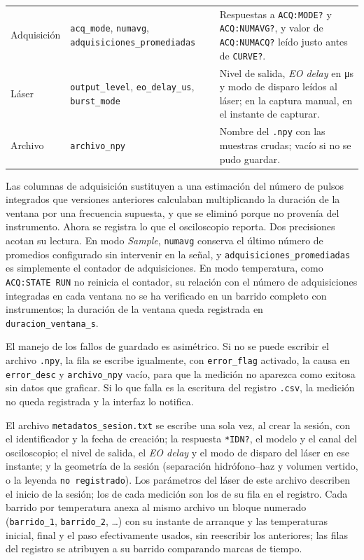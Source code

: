 \begin{table}[H]
\begin{tabularx}{\textwidth}{@{}>{\raggedright\arraybackslash}p{2.1cm}%
      >{\raggedright\arraybackslash}p{4.6cm}%
      >{\raggedright\arraybackslash}X@{}}
    \addlinespace
    Adquisición &
      \texttt{acq\_mode}, \texttt{numavg},
      \texttt{adquisiciones\_promediadas} &
      Respuestas a \texttt{ACQ:MODE?} y \texttt{ACQ:NUMAVG?}, y valor
      de \texttt{ACQ:NUMACQ?} leído justo antes de \texttt{CURVE?}. \\
    \addlinespace
    Láser &
      \texttt{output\_level}, \texttt{eo\_delay\_us},
      \texttt{burst\_mode} &
      Nivel de salida, \textit{EO delay} en \si{\micro\second} y modo
      de disparo leídos al láser; en la captura manual, en el instante
      de capturar. \\
    \addlinespace
    Archivo &
      \texttt{archivo\_npy} &
      Nombre del \texttt{.npy} con las muestras crudas; vacío si no se
      pudo guardar. \\
    \bottomrule
  \end{tabularx}
\end{table}

Las columnas de adquisición sustituyen a una estimación del número de
pulsos integrados que versiones anteriores calculaban multiplicando la
duración de la ventana por una frecuencia supuesta, y que se eliminó
porque no provenía del instrumento. Ahora se registra lo que el
osciloscopio reporta. Dos precisiones acotan su lectura. En modo
\textit{Sample}, \texttt{numavg} conserva el último número de
promedios configurado sin intervenir en la señal, y
\texttt{adquisiciones\_promediadas} es simplemente el contador de
adquisiciones. En modo temperatura, como \texttt{ACQ:STATE RUN} no
reinicia el contador, su relación con el número de adquisiciones
integradas en cada ventana no se ha verificado en un barrido completo
con instrumentos; la duración de la ventana queda registrada en
\texttt{duracion\_ventana\_s}.

El manejo de los fallos de guardado es asimétrico. Si no se puede
escribir el archivo \texttt{.npy}, la fila se escribe igualmente, con
\texttt{error\_flag} activado, la causa en \texttt{error\_desc} y
\texttt{archivo\_npy} vacío, para que la medición no aparezca como
exitosa sin datos que graficar. Si lo que falla es la escritura del
registro \texttt{.csv}, la medición no queda registrada y la interfaz
lo notifica.

El archivo \texttt{metadatos\_sesion.txt} se escribe una sola vez, al
crear la sesión, con el identificador y la fecha de creación; la
respuesta \texttt{*IDN?}, el modelo y el canal del osciloscopio; el
nivel de salida, el \textit{EO delay} y el modo de disparo del láser
en ese instante; y la geometría de la sesión (separación
hidrófono--haz y volumen vertido, o la leyenda \texttt{no registrado}).
Los parámetros del láser de este archivo describen el inicio de la
sesión; los de cada medición son los de su fila en el registro. Cada
barrido por temperatura anexa al mismo archivo un bloque numerado
(\texttt{barrido\_1}, \texttt{barrido\_2}, \ldots) con su instante de
arranque y las temperaturas inicial, final y el paso efectivamente
usados, sin reescribir los anteriores; las filas del registro se
atribuyen a su barrido comparando marcas de tiempo.

